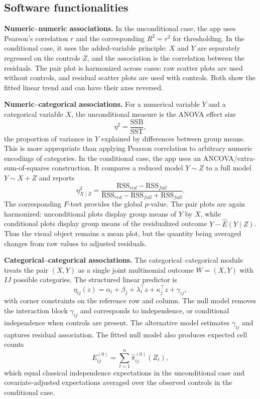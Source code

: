 \documentclass[preprint,12pt,a4paper]{elsarticle}
\begin{document}
\subsection{Software functionalities}

\textbf{Numeric--numeric associations.} In the unconditional case, the app uses Pearson's correlation $r$ and the corresponding $R^2=r^2$ for thresholding. In the conditional case, it uses the added-variable principle: $X$ and $Y$ are separately regressed on the controls $Z$, and the association is the correlation between the residuals. The pair plot is harmonized across cases: raw scatter plots are used without controls, and residual scatter plots are used with controls. Both show the fitted linear trend and can have their axes reversed.

\textbf{Numeric--categorical associations.} For a numerical variable $Y$ and a categorical variable $X$, the unconditional measure is the ANOVA effect size
\[
\eta^2=\frac{\mathrm{SSB}}{\mathrm{SST}},
\]
the proportion of variance in $Y$ explained by differences between group means. This is more appropriate than applying Pearson correlation to arbitrary numeric encodings of categories. In the conditional case, the app uses an ANCOVA/extra-sum-of-squares construction. It compares a reduced model $Y\sim Z$ to a full model $Y\sim X+Z$ and reports
\[
\eta^2_{X\mid Z}=
\frac{\mathrm{RSS}_{red}-\mathrm{RSS}_{full}}
{\mathrm{RSS}_{red}-\mathrm{RSS}_{full}+\mathrm{RSS}_{full}}.
\]
The corresponding $F$-test provides the global $p$-value. The pair plots are again harmonized: unconditional plots display group means of $Y$ by $X$, while conditional plots display group means of the residualized outcome $Y-\widehat{E}(Y\mid Z)$. Thus the visual object remains a mean plot, but the quantity being averaged changes from raw values to adjusted residuals.

\textbf{Categorical--categorical associations.} The categorical--categorical module treats the pair $(X,Y)$ as a single joint multinomial outcome $W=(X,Y)$ with $I J$ possible categories. The structured linear predictor is
\[
\eta_{ij}(z)=\alpha_i+\beta_j+\lambda_i^\top z+\kappa_j^\top z+\gamma_{ij},
\]
with corner constraints on the reference row and column. The null model removes the interaction block $\gamma_{ij}$ and corresponds to independence, or conditional independence when controls are present. The alternative model estimates $\gamma_{ij}$ and captures residual association. The fitted null model also produces expected cell counts
\[
E^{(0)}_{ij}=\sum_{t=1}^{n}\hat{\pi}^{(0)}_{ij}(Z_t),
\]
which equal classical independence expectations in the unconditional case and covariate-adjusted expectations averaged over the observed controls in the conditional case.
\end{document}
